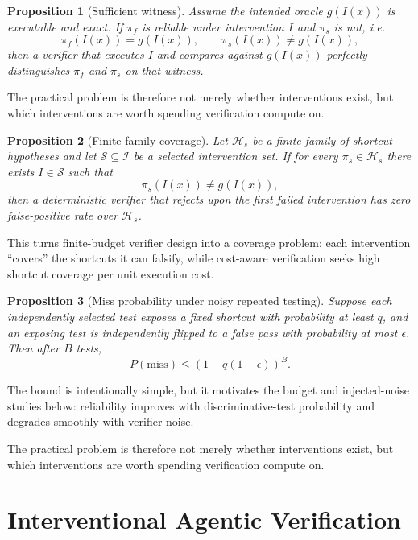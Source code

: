 \documentclass[10pt]{article}
\newtheorem{proposition}{Proposition}
\begin{document}
\begin{proposition}[Sufficient witness]
Assume the intended oracle $g(I(x))$ is executable and exact. If $\pi_f$ is reliable under intervention $I$ and $\pi_s$ is not, i.e.
\[
\pi_f(I(x))=g(I(x)),\qquad
\pi_s(I(x))\neq g(I(x)),
\]
then a verifier that executes $I$ and compares against $g(I(x))$ perfectly distinguishes $\pi_f$ and $\pi_s$ on that witness.
\end{proposition}

The practical problem is therefore not merely whether interventions exist, but which interventions are worth spending verification compute on.


\begin{proposition}[Finite-family coverage]
Let $\mathcal{H}_s$ be a finite family of shortcut hypotheses and let $\mathcal{S}\subseteq\mathcal{I}$ be a selected intervention set. If for every $\pi_s\in\mathcal{H}_s$ there exists $I\in\mathcal{S}$ such that
\[
\pi_s(I(x))\neq g(I(x)),
\]
then a deterministic verifier that rejects upon the first failed intervention has zero false-positive rate over $\mathcal{H}_s$.
\end{proposition}

This turns finite-budget verifier design into a coverage problem: each intervention ``covers'' the shortcuts it can falsify, while cost-aware verification seeks high shortcut coverage per unit execution cost.

\begin{proposition}[Miss probability under noisy repeated testing]
Suppose each independently selected test exposes a fixed shortcut with probability at least $q$, and an exposing test is independently flipped to a false pass with probability at most $\epsilon$. Then after $B$ tests,
\[
P(\mathrm{miss})\leq \left(1-q(1-\epsilon)\right)^B.
\]
\end{proposition}

The bound is intentionally simple, but it motivates the budget and injected-noise studies below: reliability improves with discriminative-test probability and degrades smoothly with verifier noise.

The practical problem is therefore not merely whether interventions exist, but which interventions are worth spending verification compute on.

\section{Interventional Agentic Verification}
\end{document}
